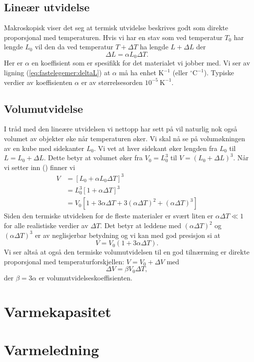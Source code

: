 \subsection{Lineær utvidelse}
Makroskopisk viser det seg at termisk utvidelse beskrives godt som direkte proporsjonal med temperaturen. Hvis vi har en stav som ved temperatur $T_0$ har lengde $L_0$ vil den da ved temperatur $T+\Delta T$ ha lengde $L+\Delta L$ der
\begin{equation}
	\Delta L = \alpha L_0\Delta T.
	\label{eq:fastelegemer:deltaL}
\end{equation}
Her er $\alpha$ en koeffisient som er spesifikk for det materialet vi jobber med. Vi ser av ligning (\ref{eq:fastelegemer:deltaL}) at $\alpha$ må ha enhet $\mathrm{K}^{-1}$ (eller $\mathrm{^\circ C}^{-1}$). Typiske verdier av koeffisienten $\alpha$ er av størrelsesorden $10^{-5}~\mathrm{K}^{-1}$.

\subsection{Volumutvidelse}
I tråd med den lineære utvidelsen vi nettopp har sett på vil naturlig nok også volumet av objekter øke når temperaturen øker. Vi skal nå se på volumøkningen av en kube med sidekanter $L_0$. Vi vet at hver sidekant øker lengden fra $L_0$ til $L = L_0+\Delta L$. Dette betyr at volumet øker fra $V_0 = L_0^3$ til $V = (L_0+\Delta L)^3$. Når vi setter inn 	(\label{eq:fastelegemer:deltaL}) finner vi
\begin{displaymath}
\begin{aligned}
	V &= \left[ L_0 + \alpha L_0 \Delta T\right]^3 \\
	&=L_0^3\left[1+\alpha \Delta T\right]^3 \\
	&=V_0 \left[1 + 3\alpha\Delta T + 3(\alpha\Delta T)^2 + (\alpha\Delta T)^3 \right]
\end{aligned}
\end{displaymath}
Siden den termiske utvidelsen for de fleste materialer er svært liten er $\alpha\Delta T\ll1$ for alle realistiske verdier av $\Delta T$. Det betyr at leddene med $(\alpha\Delta T)^2$ og $(\alpha\Delta T)^3$ er av neglisjerbar betydning og vi kan med god presisjon si at 
\begin{displaymath}
	V = V_0(1+3\alpha\Delta T).
\end{displaymath}
Vi ser altså at også den termiske volumutvidelsen til en god tilnærming er direkte proporsjonal med temperaturforskjellen: $V = V_0 + \Delta V$ med
\begin{equation}
	\Delta V = \beta V_0 \Delta T,
\end{equation}
der $\beta = 3\alpha$ er volumutvidelseskoeffisienten.

\section{Varmekapasitet}

\section{Varmeledning}